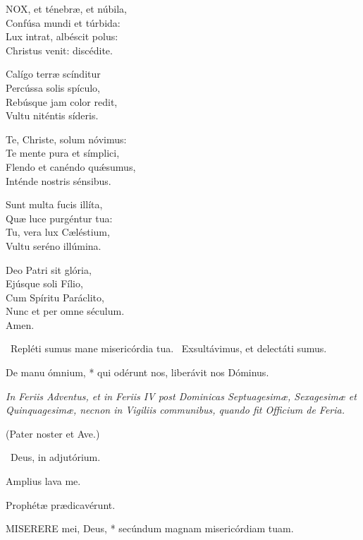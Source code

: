 
\lettrine[lines=2]{N}{OX}, et ténebræ, et núbila,\\
Confúsa mundi et túrbida:\\
Lux intrat, albéscit polus:\\
Christus venit: discédite.

Calígo terræ scínditur\\
Percússa solis spículo,\\
Rebúsque jam color redit,\\
Vultu niténtis síderis.

Te, Christe, solum nóvimus:\\
Te mente pura et símplici,\\
Flendo et canéndo quǽsumus,\\
Inténde nostris sénsibus.

Sunt multa fucis illíta,\\
Quæ luce purgéntur tua:\\
Tu, vera lux Cæléstium,\\
Vultu seréno illúmina.

Deo Patri sit glória,\\
Ejúsque soli Fílio,\\
Cum Spíritu Paráclito,\\
Nunc et per omne séculum.\\
Amen.

\V\ Repléti sumus mane misericórdia tua. \R\ Exsultávimus, et delectáti sumus.

 De manu ómnium, * qui odérunt nos, liberávit nos Dóminus.


\sectionornament


\textit{In Feriis Adventus, et in Feriis IV post Dominicas Septuagesimæ, Sexagesimæ et Quinquagesimæ, necnon in Vigiliis communibus, quando fit Officium de Feria.}

(Pater noster et Ave.)

\V\ Deus, in adjutórium.

 Amplius lava me.

  Prophétæ prædicavérunt.


\lettrine[lines=2]{M}{ISERERE} mei, Deus, * secúndum magnam misericórdiam tuam.

